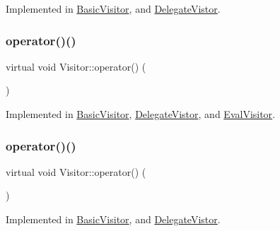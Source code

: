 Implemented in \hyperlink{struct_basic_visitor_a8fecced7470cc28d2294c93e7df7ac1d}{Basic\+Visitor}, and \hyperlink{struct_delegate_vistor_adc76c1e9388701dd55062dfb0b7f8602}{Delegate\+Vistor}.

\mbox{\label{struct_visitor_a768e64f6e6fffb7440e3c1f1a78d9481}} 
\subsubsection{\texorpdfstring{operator()()}{operator()()}\hspace{0.1cm}{\footnotesize\ttfamily [51/60]}}
{\footnotesize\ttfamily virtual void Visitor\+::operator() (\begin{DoxyParamCaption}\item[{const \hyperlink{struct_program}{Program} \&}]{ }\end{DoxyParamCaption})\hspace{0.3cm}{\ttfamily [pure virtual]}}



Implemented in \hyperlink{struct_basic_visitor_adeaf13cc53c36c871d89d6f42a1ec8db}{Basic\+Visitor}, \hyperlink{struct_delegate_vistor_ab91cc9d94f2bf10b0f971bd611e4c342}{Delegate\+Vistor}, and \hyperlink{class_eval_visitor_a9300ec33c193788bec2484b0d99c7fa3}{Eval\+Visitor}.

\mbox{\label{struct_visitor_a339d238c4c4b3c356878817481b398be}} 
\subsubsection{\texorpdfstring{operator()()}{operator()()}\hspace{0.1cm}{\footnotesize\ttfamily [52/60]}}
{\footnotesize\ttfamily virtual void Visitor\+::operator() (\begin{DoxyParamCaption}\item[{const \hyperlink{struct_element_list}{Element\+List} \&}]{ }\end{DoxyParamCaption})\hspace{0.3cm}{\ttfamily [pure virtual]}}



Implemented in \hyperlink{struct_basic_visitor_ae04e6bd948d2f85acaff8744ad6ab0d7}{Basic\+Visitor}, and \hyperlink{struct_delegate_vistor_afbce8eda3e6024acaded090bd1f148b4}{Delegate\+Vistor}.

